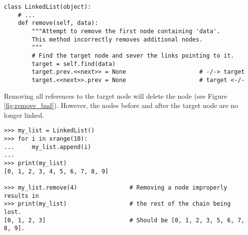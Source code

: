 \begin{lstlisting}
class LinkedList(object):
    # ...
    def remove(self, data):
        """Attempt to remove the first node containing 'data'.
        This method incorrectly removes additional nodes.
        """
        # Find the target node and sever the links pointing to it.
        target = self.find(data)
        target.prev.<<next>> = None                     # -/-> target
        target.<<next>>.prev = None                     # target <-/-
\end{lstlisting}

Removing all references to the target node will delete the node (see Figure \ref{fig:remove_bad}).
However, the nodes before and after the target node are no longer linked.

\begin{lstlisting}
>>> my_list = LinkedList()
>>> for i in xrange(10):
...     my_list.append(i)
...
>>> print(my_list)
[0, 1, 2, 3, 4, 5, 6, 7, 8, 9]

>>> my_list.remove(4)               # Removing a node improperly results in
>>> print(my_list)                  # the rest of the chain being lost.
[0, 1, 2, 3]                        # Should be [0, 1, 2, 3, 5, 6, 7, 8, 9].
\end{lstlisting}

